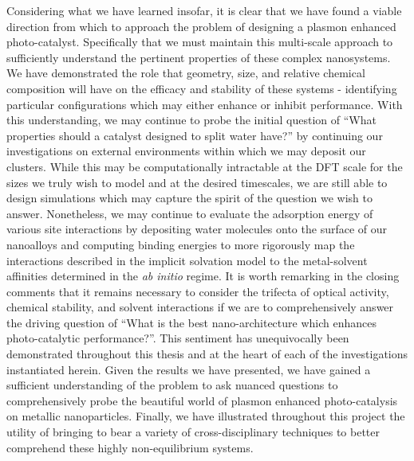 Considering what we have learned insofar, it is clear that we have found a viable direction from which to approach the problem of designing a plasmon enhanced photo-catalyst. Specifically that we must maintain this multi-scale approach to sufficiently understand the pertinent properties of these complex nanosystems. We have demonstrated the role that geometry, size, and relative chemical composition will have on the efficacy and stability of these systems - identifying particular configurations which may either enhance or inhibit performance. With this understanding, we may continue to probe the initial question of ``What properties should a catalyst designed to split water have?'' by continuing our investigations on external environments within which we may deposit our clusters. While this may be computationally intractable at the DFT scale for the sizes we truly wish to model and at the desired timescales, we are still able to design simulations which may capture the spirit of the question we wish to answer. Nonetheless, we may continue to evaluate the adsorption energy of various site interactions by depositing water molecules onto the surface of our nanoalloys and computing binding energies to more rigorously map the interactions described in the implicit solvation model to the metal-solvent affinities determined in the \textit{ab initio} regime. It is worth remarking in the closing comments that it remains necessary to consider the trifecta of optical activity, chemical stability, and solvent interactions if we are to comprehensively answer the driving question of ``What is the best nano-architecture which enhances photo-catalytic performance?''. This sentiment has unequivocally been demonstrated throughout this thesis and at the heart of each of the investigations instantiated herein. Given the results we have presented, we have gained a sufficient understanding of the problem to ask nuanced questions to comprehensively probe the beautiful world of plasmon enhanced photo-catalysis on metallic nanoparticles. Finally, we have illustrated throughout this project the utility of bringing to bear a variety of cross-disciplinary techniques to better comprehend these highly non-equilibrium systems.
